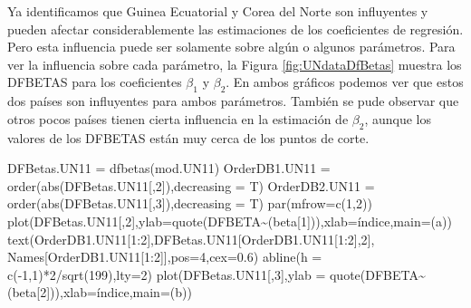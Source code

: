 \documentclass[
]{article}
\newenvironment{Shaded}{\begin{snugshade}}{\end{snugshade}}
\newcommand{\AttributeTok}[1]{\textcolor[rgb]{0.77,0.63,0.00}{#1}}
\newcommand{\DecValTok}[1]{\textcolor[rgb]{0.00,0.00,0.81}{#1}}
\newcommand{\FloatTok}[1]{\textcolor[rgb]{0.00,0.00,0.81}{#1}}
\newcommand{\FunctionTok}[1]{\textcolor[rgb]{0.00,0.00,0.00}{#1}}
\newcommand{\NormalTok}[1]{#1}
\newcommand{\OtherTok}[1]{\textcolor[rgb]{0.56,0.35,0.01}{#1}}
\newcommand{\SpecialCharTok}[1]{\textcolor[rgb]{0.00,0.00,0.00}{#1}}
\newcommand{\StringTok}[1]{\textcolor[rgb]{0.31,0.60,0.02}{#1}}
\begin{document}
Ya identificamos que Guinea Ecuatorial y Corea del Norte son influyentes y pueden afectar considerablemente las estimaciones de los coeficientes de regresión. Pero esta influencia puede ser solamente sobre algún o algunos parámetros. Para ver la influencia sobre cada parámetro, la Figura \ref{fig:UNdataDfBetas} muestra los DFBETAS para los coeficientes \(\beta_{1}\) y \(\beta_{2}\). En ambos gráficos podemos ver que estos dos países son influyentes para ambos parámetros. También se pude observar que otros pocos países tienen cierta influencia en la estimación de \(\beta_{2}\), aunque los valores de los DFBETAS están muy cerca de los puntos de corte.

\begin{Shaded}
\begin{Highlighting}[]
\NormalTok{DFBetas.UN11 }\OtherTok{=} \FunctionTok{dfbetas}\NormalTok{(mod.UN11)}
\NormalTok{OrderDB1.UN11 }\OtherTok{=} \FunctionTok{order}\NormalTok{(}\FunctionTok{abs}\NormalTok{(DFBetas.UN11[,}\DecValTok{2}\NormalTok{]),}\AttributeTok{decreasing =}\NormalTok{ T)}
\NormalTok{OrderDB2.UN11 }\OtherTok{=} \FunctionTok{order}\NormalTok{(}\FunctionTok{abs}\NormalTok{(DFBetas.UN11[,}\DecValTok{3}\NormalTok{]),}\AttributeTok{decreasing =}\NormalTok{ T)}
\FunctionTok{par}\NormalTok{(}\AttributeTok{mfrow=}\FunctionTok{c}\NormalTok{(}\DecValTok{1}\NormalTok{,}\DecValTok{2}\NormalTok{))}
\FunctionTok{plot}\NormalTok{(DFBetas.UN11[,}\DecValTok{2}\NormalTok{],}\AttributeTok{ylab=}\FunctionTok{quote}\NormalTok{(}\StringTok{\textquotesingle{}DFBETA\textquotesingle{}}\SpecialCharTok{\textasciitilde{}}\NormalTok{(beta[}\DecValTok{1}\NormalTok{])),}\AttributeTok{xlab=}\StringTok{\textquotesingle{}índice\textquotesingle{}}\NormalTok{,}\AttributeTok{main=}\StringTok{\textquotesingle{}(a)\textquotesingle{}}\NormalTok{)}
\FunctionTok{text}\NormalTok{(OrderDB1.UN11[}\DecValTok{1}\SpecialCharTok{:}\DecValTok{2}\NormalTok{],DFBetas.UN11[OrderDB1.UN11[}\DecValTok{1}\SpecialCharTok{:}\DecValTok{2}\NormalTok{],}\DecValTok{2}\NormalTok{],}
\NormalTok{     Names[OrderDB1.UN11[}\DecValTok{1}\SpecialCharTok{:}\DecValTok{2}\NormalTok{]],}\AttributeTok{pos=}\DecValTok{4}\NormalTok{,}\AttributeTok{cex=}\FloatTok{0.6}\NormalTok{)}
\FunctionTok{abline}\NormalTok{(}\AttributeTok{h =} \FunctionTok{c}\NormalTok{(}\SpecialCharTok{{-}}\DecValTok{1}\NormalTok{,}\DecValTok{1}\NormalTok{)}\SpecialCharTok{*}\DecValTok{2}\SpecialCharTok{/}\FunctionTok{sqrt}\NormalTok{(}\DecValTok{199}\NormalTok{),}\AttributeTok{lty=}\DecValTok{2}\NormalTok{)}
\FunctionTok{plot}\NormalTok{(DFBetas.UN11[,}\DecValTok{3}\NormalTok{],}\AttributeTok{ylab =} \FunctionTok{quote}\NormalTok{(}\StringTok{\textquotesingle{}DFBETA\textquotesingle{}}\SpecialCharTok{\textasciitilde{}}\NormalTok{(beta[}\DecValTok{2}\NormalTok{])),}\AttributeTok{xlab=}\StringTok{\textquotesingle{}índice\textquotesingle{}}\NormalTok{,}\AttributeTok{main=}\StringTok{\textquotesingle{}(b)\textquotesingle{}}\NormalTok{)}

\end{Highlighting}
\end{Shaded}
\end{document}
